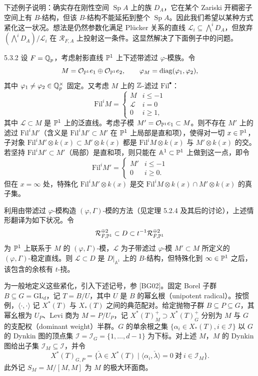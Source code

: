 下述例子说明：确实存在刚性空间 $\operatorname{Sp} A$ 上的族 $D_A$，它在某个 Zariski 开稠密子空间上有 $B$-结构，但该 $B$-结构不能延拓到整个 $\operatorname{Sp} A$。因此我们希望以某种方式紧化这一状况。想法是仍然参数化满足 Plücker 关系的直线 $\mathcal{L}_i\subseteq\bigwedge^iD_A$，但放弃 $(\bigwedge^iD_A)/\mathcal{L}_i$ 在 $\mathcal{R}_{F,A}$ 上投射这一条件。这显然解决了下面例子中的问题。

\begin{exam}{5.3.2}
设 $F=\mathbb{Q}_p$，考虑射影直线 $\mathbb{P}^1$ 上下述带滤过 $\varphi$-模族。令
\[
M=\mathcal{O}_{\mathbb{P}^1}e_1\oplus\mathcal{O}_{\mathbb{P}^1}e_2,\qquad\varphi_M=\mathrm{diag}(\varphi_1,\varphi_2),
\]
其中 $\varphi_1\neq\varphi_2\in\mathbb{Q}_p^\times$ 固定。又考虑 $M$ 上的 $\mathbb{Z}$-滤过 $\mathrm{Fil}^\bullet$：
\[
\mathrm{Fil}^iM=\begin{cases}M & i\le-1\\ \mathscr{L} & i=0\\ 0 & i\ge1,\end{cases}
\]
其中 $\mathscr{L}\subset M$ 是 $\mathbb{P}^1$ 上的泛直线。考虑子模 $M'=\mathcal{O}_{\mathbb{P}^1}e_1\subset M$。则不存在 $M'$ 上的滤过 $\mathrm{Fil}^iM'$（含义是 $\mathrm{Fil}^iM'\subset M'$ 在 $\mathbb{P}^1$ 上局部是直和项），使得对一切 $x\in\mathbb{P}^1$，子对象 $\mathrm{Fil}^iM'\otimes k(x)\subset M'\otimes k(x)$ 都是 $\mathrm{Fil}^iM\otimes k(x)$ 与 $M'\otimes k(x)$ 的交。若坚持 $\mathrm{Fil}^iM'\subset M'$（局部）是直和项，则只能在 $\mathbb{A}^1\subset\mathbb{P}^1$ 上做到这一点，即令
\[
\mathrm{Fil}^iM'=\begin{cases}M' & i\le-1\\ 0 & i\ge0.\end{cases}
\]
但在 $x=\infty$ 处，特殊化 $\mathrm{Fil}^iM'\otimes k(x)$ 是交 $\mathrm{Fil}^iM\otimes k(x)\cap M'\otimes k(x)$ 的真子集。
\label{thm:a4-5-3-2}
\end{exam}

利用由带滤过 $\varphi$-模构造 $(\varphi,\Gamma)$-模的方法（见定理 5.2.4 及其后的讨论），上述情形翻译为如下状况。令
\[
\mathcal{R}^{\oplus2}_{F,\mathbb{P}^1}\subset D\subset t^{-1}\mathcal{R}^{\oplus2}_{F,\mathbb{P}^1}
\]
为 $\mathbb{P}^1$ 上联系于 $M$ 的 $(\varphi,\Gamma)$-模，$\mathcal{L}$ 为子带滤过 $\varphi$-模 $M'\subset M$ 所定义的 $(\varphi,\Gamma)$-稳定直线。则 $\mathcal{L}\subset D$ 是 $D|_{\mathbb{A}^1}$ 上的 $B$-结构，但特殊化到 $\infty\in\mathbb{P}^1$ 之后，该包含的余核有 $t$-挠。

为一般地定义这些紧化，引入下述记号，参 [BG02]。固定 Borel 子群 $B\subseteq G=\mathrm{GL}_d$，记 $T=B/U$，其中 $U$ 是 $B$ 的幂幺根（unipotent radical）。按惯例，$\langle\cdot,\cdot\rangle$ 记 $X^*(T)$ 与 $X_*(T)$ 之间的典范配对。给定抛物子群 $B\subseteq P\subseteq G$，其幂幺根为 $U_P$、Levi 商为 $M=P/U_P$，记 $X^*(T)^+_M\supset X^*(T)^+_G$ 分别为 $M$ 与 $G$ 的支配权（dominant weight）半群。$G$ 的单余根之集 $\{\alpha_i\in X_*(T),i\in\mathcal{I}\}$ 以 $G$ 的 Dynkin 图的顶点集 $\mathcal{I}=\mathcal{I}_G=\{1,\dots,d-1\}$ 为下标。对上述 $M$，$M$ 的 Dynkin 图给出子集 $\mathcal{I}_M\subseteq\mathcal{I}$，并令
\[
X^*(T)_{G,P}=\{\check\lambda\in X^*(T)\mid\langle\alpha_i,\check\lambda\rangle=0\ \text{对}\ i\in\mathcal{I}_M\}.
\]
此外记 $S_M=M/[M,M]$ 为 $M$ 的极大环面商。

